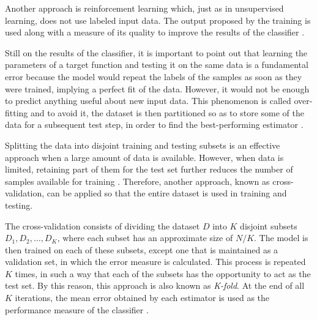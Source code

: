 Another approach is reinforcement learning which, just as in unsupervised learning, does not use labeled input data. The output proposed by the training is used along with a measure of its quality to improve the results of the classifier \citep{mostafa:12}.

Still on the results of the classifier, it is important to point out that learning the parameters of a target function and testing it on the same data is a fundamental error because the model would repeat the labels of the samples as soon as they were trained, implying a perfect fit of the data. However, it would not be enough to predict anything useful about new input data. This phenomenon is called over-fitting and to avoid it, the dataset is then partitioned so as to store some of the data for a subsequent test step, in order to find the best-performing estimator \citep{mostafa:12}.

Splitting the data into disjoint training and testing subsets is an effective approach when a large amount of data is available. However, when data is limited, retaining part of them for the test set further reduces the number of samples available for training \citep{mitchell:97}. Therefore, another approach, known as cross-validation, can be applied so that the entire dataset is used in training and testing.

The cross-validation consists of dividing the dataset $D$ into $K$ disjoint subsets $D_1, D_2, \ldots, D_K$, where each subset has an approximate size of $N / K$. The model is then trained on each of these subsets, except one that is maintained as a validation set, in which the error measure is calculated. This process is repeated $K$ times, in such a way that each of the subsets has the opportunity to act as the test set. By this reason, this approach is also known as \emph{K-fold}. At the end of all $K$ iterations, the mean error obtained by each estimator is used as the performance measure of the classifier \citep{mostafa:12}.